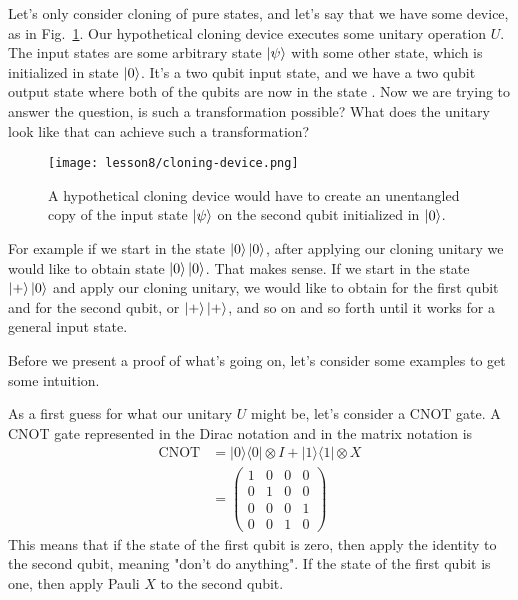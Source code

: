 Let's only consider cloning of pure states, and let's say that we have some device, as in Fig.~\ref{fig:cloner}. Our hypothetical cloning device executes some unitary operation $U$. The input states are some arbitrary state $\left| \psi \right\rangle$ with some other state, which is initialized in state $\left| 0 \right\rangle$. It's a two qubit input state, and we have a two qubit output state where both of the qubits are now in the state \ket{\psi}. Now we are trying to answer the question, is such a transformation possible? What does the unitary look like that can achieve such a transformation?
\begin{figure}[H]
    \centering
    \texttt{[image: lesson8/cloning-device.png]}
        \caption[A hypothetical cloning device.]{A hypothetical cloning device would have to create an unentangled copy of the input state $\left| \psi \right\rangle$ on the second qubit initialized in $\left| 0 \right\rangle$.}
    \label{fig:cloner}
\end{figure}

For example if we start in the state $\left| 0 \right\rangle\left| 0 \right\rangle$, after applying our cloning unitary we would like to obtain state $\left| 0 \right\rangle\left| 0 \right\rangle$. That makes sense. If we start in the state $\left| + \right\rangle\left| 0 \right\rangle$ and apply our cloning unitary, we would like to obtain \ket{+} for the first qubit and \ket{+} for the second qubit, or $\left| + \right\rangle\left| + \right\rangle$, and so on and so forth until it works for a general input state.

Before we present a proof of what's going on, let's consider some examples to get some intuition.

As a first guess for what our unitary $U$ might be, let's consider a CNOT gate. A CNOT gate represented in the Dirac notation and in the matrix notation is
\begin{equation}
\begin{aligned}
\operatorname{CNOT} &=|0\rangle\langle 0|\otimes I+| 1\rangle\langle 1| \otimes X \\
&=\left(\begin{array}{llll}
1 & 0 & 0 & 0 \\
0 & 1 & 0 & 0 \\
0 & 0 & 0 & 1 \\
0 & 0 & 1 & 0
\end{array}\right)
\end{aligned}
\end{equation}
This means that if the state of the first qubit is zero, then apply the identity to the second qubit, meaning "don't do anything". If the state of the first qubit is one, then apply Pauli $X$ to the second qubit.

